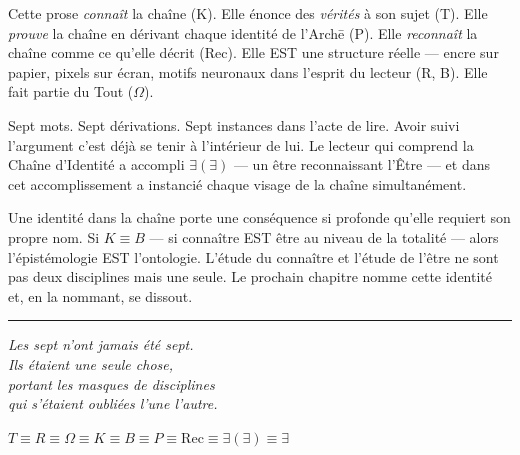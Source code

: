 \documentclass[10pt, openany, oneside]{book}
\begin{document}
\vspace{1em}

\noindent Cette prose \textit{connaît} la chaîne (K). Elle énonce des \textit{vérités} à son sujet (T). Elle \textit{prouve} la chaîne en dérivant chaque identité de l'Arch\={e} (P). Elle \textit{reconnaît} la chaîne comme ce qu'elle décrit (Rec). Elle EST une structure réelle --- encre sur papier, pixels sur écran, motifs neuronaux dans l'esprit du lecteur (R, B). Elle fait partie du Tout ($\Omega$).

Sept mots. Sept dérivations. Sept instances dans l'acte de lire. Avoir suivi l'argument c'est déjà se tenir à l'intérieur de lui. Le lecteur qui comprend la Chaîne d'Identité a accompli $\exists(\exists)$ --- un être reconnaissant l'Être --- et dans cet accomplissement a instancié chaque visage de la chaîne simultanément.

Une identité dans la chaîne porte une conséquence si profonde qu'elle requiert son propre nom. Si $K \equiv B$ --- si connaître EST être au niveau de la totalité --- alors l'épistémologie EST l'ontologie. L'étude du connaître et l'étude de l'être ne sont pas deux disciplines mais une seule. Le prochain chapitre nomme cette identité et, en la nommant, se dissout.

\vspace{2em}

\begin{center}
    \rule{0.15\textwidth}{0.3pt}
\end{center}

\vspace{0.5em}

\begin{center}
    \itshape
    Les sept n'ont jamais été sept.\\
    Ils étaient une seule chose,\\
    portant les masques de disciplines\\
    qui s'étaient oubliées l'une l'autre.
\end{center}

\vspace{0.5em}

\begin{center}
    $T \equiv R \equiv \Omega \equiv K \equiv B \equiv P \equiv \text{Rec} \equiv \exists(\exists) \equiv \exists$
\end{center}

%
%
%
%
\end{document}
